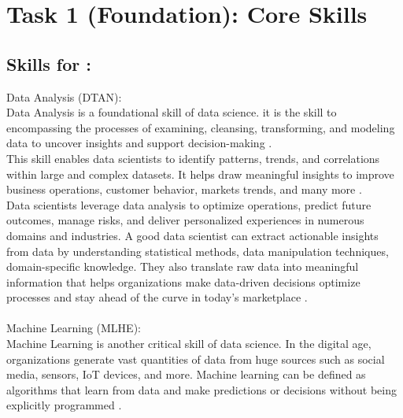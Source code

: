 \documentclass[a4paper, 11pt]{report}
\begin{document}

\tableofcontents


\newpage

\newpage
\section{Task 1 (Foundation): Core Skills}

\newpage
\subsection{Skills for \majB: \studB}
Data Analysis (DTAN):
\\[1em]
Data Analysis is a foundational skill of data science. it is the skill to encompassing the processes of examining, cleansing, transforming, and modeling data to uncover insights and support decision-making \cite{Dtan1}.
\\[1em]
This skill enables data scientists to identify patterns, trends, and correlations within large and complex datasets. It helps draw meaningful insights to improve business operations, customer behavior, markets trends, and many more \cite{Dtan3}. 
\\[1em]
Data scientists leverage data analysis to optimize operations, predict future outcomes, manage risks, and deliver personalized experiences in numerous domains and industries. A good data scientist can extract actionable insights from data by understanding statistical methods, data manipulation techniques, domain-specific knowledge. They also translate raw data into meaningful information that helps organizations make data-driven decisions optimize processes and stay ahead of the curve in today’s marketplace \cite{Dtan2}\cite{Dtan3}.
\\[1em]
\\[1em]
\noindent Machine Learning (MLHE):
\\[1em]
Machine Learning is another critical skill of data science. In the digital age, organizations generate vast quantities of data from huge sources such as social media, sensors, IoT devices, and more. Machine learning can be defined as algorithms that learn from data and make predictions or decisions without being explicitly programmed \cite{Mlhe1}.
\end{document}

